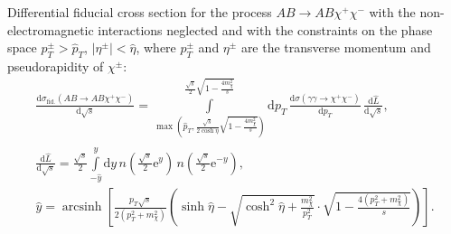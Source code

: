 \documentclass[a4paper,12pt]{article}
\newcommand{\abs}[1]{\lvert #1 \rvert}
\DeclareMathOperator{\arcsinh}{arcsinh}
\begin{document}
Differential fiducial cross section for the process $AB \to AB \chi^+ \chi^-$
with the non-electromagnetic interactions neglected and with the constraints on
the phase space $p_T^\pm > \hat p_T$, $\abs{\eta^\pm} < \hat \eta$, where
$p_T^\pm$ and $\eta^\pm$ are the transverse momentum and pseudorapidity of
$\chi^\pm$:
\begin{gather}
  \frac{\mathrm{d} \sigma_\text{fid.}(AB \to AB \chi^+ \chi^-)}
       {\mathrm{d} \sqrt{s}}
  = \int\limits_{
      \max \left(
        \hat p_T,
        \frac{\sqrt{s}}{2 \cosh \hat \eta} \sqrt{1 - \frac{4 m_\chi^2}{s}}
      \right)
    }^{\frac{\sqrt{s}}{2} \sqrt{1 - \frac{4 m_\chi^2}{s}}}
      \mathrm{d} p_T
      \, \frac{\mathrm{d} \sigma(\gamma \gamma \to \chi^+ \chi^-)}
              {\mathrm{d} p_T}
      \, \frac{\mathrm{d} \hat L}{\mathrm{d} \sqrt{s}},
  \\
  \frac{\mathrm{d} \hat L}{\mathrm{d} \sqrt{s}}
  = \frac{\sqrt{s}}{2}
    \int\limits_{-\hat y}^{\hat y} \mathrm{d} y
    \, n \left( \frac{\sqrt{s}}{2} \mathrm{e}^y \right)
    \, n \left( \frac{\sqrt{s}}{2} \mathrm{e}^{-y} \right),
  \\
  \hat y = \arcsinh \left[
    \frac{p_T \sqrt{s}}{2 (p_T^2 + m_\chi^2)} \left(
      \sinh \hat \eta
      - \sqrt{\cosh^2 \hat \eta + \frac{m_\chi^2}{p_T^2}}
        \cdot \sqrt{1 - \frac{4 (p_T^2 + m_\chi^2)}{s}}
    \right)
  \right].
\end{gather}
\end{document}
